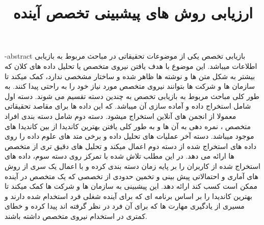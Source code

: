 \documentclass[oneside,openany,msc]{SBU-Thesis}
\begin{document}
	\title{ارزیابی روش های پیشبینی تخصص آینده}
	
	\subject{مهندسی کامپیوتر}
	
	
	
	
	


	
	
	

	\fa-abstract{
		\hspace*{2em}بازیابی تخصص یکی از موضوعات تحقیقاتی در مباحث مربوط به بازیابی اطلاعات میباشد. این موضوع با هدف یافتن نیروی متخصص یا تحلیل داده های کلان که بیشتر به شکل متن ها و نوشته ها ظاهر شده و ساختار مشخصی ندارد، کمک میکند تا سازمان ها و شرکت ها بتوانند نیروی متخصص مورد نیاز خود را به راحتی پیدا کنند.
به طور کلی مباحث مربوط به بازیابی تخصص به چندین دسته تقسیم می شوند. دسته اول شامل استخراج داده و آماده سازی آن میباشد. که این داده ها برای مقاصد تحقیقاتی معمولا از انجمن های آنلاین استخراج میشود. دسته دوم شامل دسته بندی افراد متخصص ، نمره دهی به آن ها و به طور کلی یافتن بهترین کاندیدا از بین کاندیدا های موجود میباشد. دسته آخر عملیات های تحلیل داده و برخی متد های علوم داده را روی داده های استخراج شده از دسته دوم اعمال میکند و تحلیل های دقیق تری از متخصص ها ارائه می دهد.
در این مطلب تلاش شده با تمرکز روی دسته سوم، داده های استخراج شده از کاربران را بر پایه زمان دسته بندی کرده و با اعمال یک سری از روش های آماری و احتمالاتی پیش بینی و تخمین حدودی از تخصصی که یک متخصص در آینده ممکن است کسب کند ارائه دهد. این پیشبینی به سازمان ها و شرکت ها کمک میکند تا بهترین کاندیدا را بر اساس برنامه ای که برای آینده شغلی فرد استخدام شده دارند و مسیری از یادگیری مهارت ها که برای آن فرد در نظر گرفته اند پیدا کرده و خطای کمتری در استخدام نیروی متخصص داشته باشند.
	}
	
\end{document}
